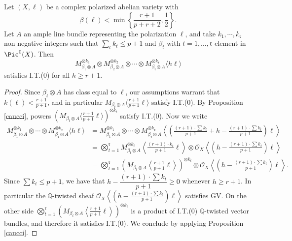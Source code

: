 \documentclass[11pt,letter]{amsart}
\numberwithin{equation}{section}
\begin{document}
\begin{lemma}\label{IT0Q}
    Let $(X,\ell)$ be a complex polarized abelian variety with 
    \[
    \beta(\ell)<\min\left\{\frac{r+1}{p+r+2},\frac{1}{2}\right\}.
    \]
    Let $A$ an ample line bundle representing the polarization $\ell$, and take $k_1,\cdots, k_\mathfrak{r}$  non negative integers such that  $\sum_tk_t\leq p+1$ and $\beta_t$ with $t=1,\ldots, \mathfrak{r}$ element in $\Pic^0(X)$. Then 
    \[M_{\beta_1\otimes A}^{\otimes k_1}\otimes M_{\beta_2\otimes A}^{\otimes k_2}\otimes\cdots\otimes M_{\beta_{\mathfrak{r}}\otimes A}^{\otimes k_\mathfrak{r}}\langle h\ell\rangle \]
    satisfies I.T.(0) for all $h\geq r+1$.
\end{lemma}
\begin{proof}
   Since $\beta_t\otimes A$ has class equal to $\ell$, our assumptions warrant that $k(\ell)<\frac{r+1}{p+1}$, and in particular $M_{\beta_t\otimes A}\langle\frac{r+1}{p+1}\ell\rangle$ satisfy I.T.(0). By Proposition \ref{caucci}, powers $\left(M_{\beta_t\otimes A}\langle\frac{r+1}{p+1}\ell\rangle\right)^{\otimes k_t}$ satisfy I.T.(0). Now we write
   \begin{align*}
       M_{\beta_1\otimes A}^{\otimes k_1}\otimes \cdots\otimes M_{\beta_{\mathfrak{r}}\otimes A}^{\otimes k_\mathfrak{r}}\langle h\ell\rangle
       &= M_{\beta_1\otimes A}^{\otimes k_1}\otimes \cdots\otimes M_{\beta_{\mathfrak{r}}\otimes A}^{\otimes k_\mathfrak{r}}\left\langle \left(\frac{(r+1)\cdot\sum k_t}{p+1}+h-\frac{(r+1)\cdot\sum k_t}{p+1}\right)\ell\right\rangle\\
       &= \bigotimes_{t=1}^\mathfrak{r}M_{\beta_t\otimes A}^{\otimes k_t}\left\langle\frac{(r+1)\cdot k_t}{p+1}\ell\right\rangle\otimes \mathcal{O}_X\left\langle \left(h-\frac{(r+1)\cdot\sum k_t}{p+1}\right)\ell\right\rangle\\
       &=\bigotimes_{t=1}^\mathfrak{r} \left(M_{\beta_t\otimes A}\left\langle\frac{r+1}{p+1}\ell\right\rangle\right)^{\otimes k_t}\otimes \mathcal{O}_X\left\langle \left(h-\frac{(r+1)\cdot\sum k_t}{p+1}\right)\ell\right\rangle.
   \end{align*}
   Since $\sum k_t\leq p+1$, we have that $h-\dfrac{(r+1)\cdot\sum k_t}{p+1}\geq 0$ whenever $h\geq r+1$. In particular the $\mathbb{Q}$-twisted sheaf $\mathcal{O}_X\left\langle \left(h-\frac{(r+1)\cdot\sum k_t}{p+1}\right)\ell\right\rangle$ satisfies GV. On the other side $\bigotimes_{t=1}^{\mathfrak{r}} \left(M_{\beta_t\otimes A}\left\langle\frac{r+1}{p+1}\ell\right\rangle\right)^{\otimes k_t}$ is a product of I.T.(0) $\mathbb{Q}$-twisted vector bundles, and therefore it satisfies I.T.(0). We conclude by applying Proposition \ref{caucci}.\end{proof}
   
\end{document}
